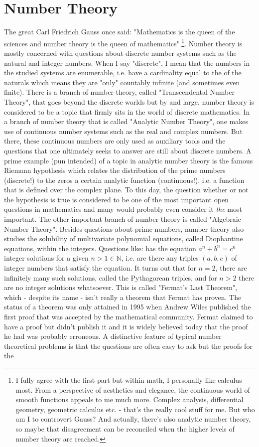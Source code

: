 \chapter{Number Theory}
The great Carl Friedrich Gauss once said: "Mathematics is the queen of the sciences and number theory is the queen of mathematics" \footnote{I fully agree with the first part but within math, I personally like calculus most. From a perspective of aesthetics and elegance, the continuous world of smooth functions appeals to me much more. Complex analysis, differential geometry, geometric calculus etc. - that's the really cool stuff for me. But who am I to controvert Gauss? And actually, there's also analytic number theory, so maybe that disagreement can be reconciled when the higher levels of number theory are reached.}. Number theory is mostly concerned with questions about discrete number systems such as the natural and integer numbers. When I say "discrete", I mean that the numbers in the studied systems are enumerable, i.e. have a cardinality equal to the of the naturals which means they are "only" countably infinite (and sometimes even finite). There is a branch of number theory, called "Transcendental Number Theory", that goes beyond the discrete worlds but by and large, number theory is considered to be a topic that firmly sits in the world of discrete mathematics. In a branch of number theory that is called "Analytic Number Theory", one makes use of continuous number systems such as the real and complex numbers. But there, these continuous numbers are only used as auxiliary tools and the questions that one ultimately seeks to answer are still about discrete numbers. A prime example (pun intended) of a topic in analytic number theory is the famous Riemann hypothesis which relates the distribution of the prime numbers (discrete!) to the zeros a certain analytic function (continuous!), i.e. a function that is defined over the complex plane. To this day, the question whether or not the hypothesis is true is considered to be one of the most important open questions in mathematics and many would probably even consider it \emph{the} most important. The other important branch of number theory is called "Algebraic Number Theory". Besides questions about prime numbers, number theory also studies the solubility of multivariate polynomial equations, called Diophantine equations, within the integers. Questions like: has the equation $a^n + b^n = c^n$ integer solutions for a given $n > 1 \in \mathbb{N}$, i.e. are there any triples $(a,b,c)$ of integer numbers that satisfy the equation. It turns out that for $n=2$, there are infinitely many such solutions, called the Pythagorean triples, and for $n > 2$ there are no integer solutions whatsoever. This is called "Fermat's Last Theorem", which - despite its name - isn't really a theorem that Fermat has proven. The status of a theorem was only attained in 1995 when Andrew Wiles published the first proof that was accepted by the mathematical community. Fermat claimed to have a proof but didn't publish it and it is widely believed today that the proof he had was probably erroneous. A distinctive feature of typical number theoretical problems is that the questions are often easy to ask but the proofs for the 
